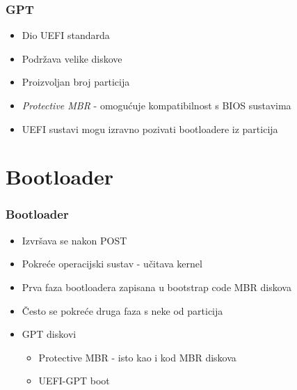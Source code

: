 \documentclass[t]{beamer}
\begin{document}
\begin{frame}
	\frametitle{GPT}
	\begin{itemize}
		\item Dio UEFI standarda
		\item Podržava velike diskove 
		\item Proizvoljan broj particija
	\end{itemize}
	\begin{itemize}
		\item \emph{Protective MBR} - omogućuje kompatibilnost s BIOS sustavima
		\item UEFI sustavi mogu izravno pozivati bootloadere iz particija
	\end{itemize}
\end{frame}

\section{Bootloader}
\begin{frame}
	\frametitle{Bootloader}
	\begin{itemize}
		\item Izvršava se nakon POST
		\item Pokreće operacijski sustav - učitava kernel
	\end{itemize}
	
	\begin{itemize}
		\item Prva faza bootloadera zapisana u bootstrap code MBR diskova
		\item Često se pokreće druga faza s neke od particija
	\end{itemize}
	\begin{itemize}
		\item GPT diskovi
		\begin{itemize}
	 		\item Protective MBR - isto kao i kod MBR diskova
			\item UEFI-GPT boot
		\end{itemize}
	\end{itemize}
\end{frame}
\end{document}
